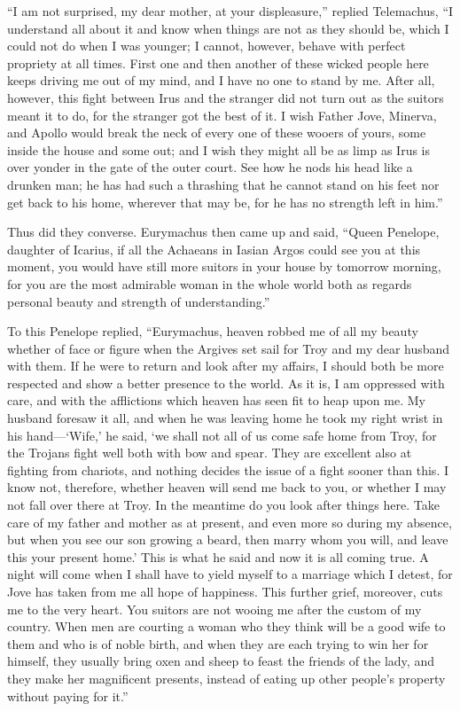“I am not surprised, my dear mother, at your displeasure,” replied Telemachus,
“I understand all about it and know when things are not as they should be,
which I could not do when I was younger; I cannot, however, behave with perfect
propriety at all times. First one and then another of these wicked people here
keeps driving me out of my mind, and I have no one to stand by me. After all,
however, this fight between Irus and the stranger did not turn out as the
suitors meant it to do, for the stranger got the best of it. I wish Father
Jove, Minerva, and Apollo would break the neck of every one of these wooers of
yours, some inside the house and some out; and I wish they might all be as limp
as Irus is over yonder in the gate of the outer court. See how he nods his head
like a drunken man; he has had such a thrashing that he cannot stand on his
feet nor get back to his home, wherever that may be, for he has no strength
left in him.”

Thus did they converse. Eurymachus then came up and said, “Queen Penelope,
daughter of Icarius, if all the Achaeans in Iasian Argos could see you at this
moment, you would have still more suitors in your house by tomorrow morning,
for you are the most admirable woman in the whole world both as regards
personal beauty and strength of understanding.”

To this Penelope replied, “Eurymachus, heaven robbed me of all my beauty
whether of face or figure when the Argives set sail for Troy and my dear
husband with them. If he were to return and look after my affairs, I should
both be more respected and show a better presence to the world. As it is, I am
oppressed with care, and with the afflictions which heaven has seen fit to heap
upon me. My husband foresaw it all, and when he was leaving home he took my
right wrist in his hand—‘Wife,’ he said, ‘we shall not all of us come safe home
from Troy, for the Trojans fight well both with bow and spear. They are
excellent also at fighting from chariots, and nothing decides the issue of a
fight sooner than this. I know not, therefore, whether heaven will send me back
to you, or whether I may not fall over there at Troy. In the meantime do you
look after things here. Take care of my father and mother as at present, and
even more so during my absence, but when you see our son growing a beard, then
marry whom you will, and leave this your present home.’ This is what he said
and now it is all coming true. A night will come when I shall have to yield
myself to a marriage which I detest, for Jove has taken from me all hope of
happiness. This further grief, moreover, cuts me to the very heart. You suitors
are not wooing me after the custom of my country. When men are courting a woman
who they think will be a good wife to them and who is of noble birth, and when
they are each trying to win her for himself, they usually bring oxen and sheep
to feast the friends of the lady, and they make her magnificent presents,
instead of eating up other people’s property without paying for it.”

